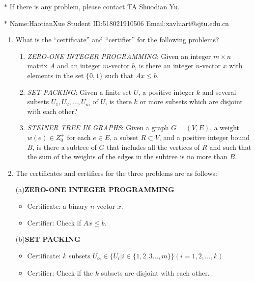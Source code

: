 \documentclass[12pt,a4paper]{article}
\makeatletter
\newtheorem*{solution}{Solution}
\theoremstyle{definition}
\renewenvironment{solution}[1][Solution] {\par\pushQED{\qed}\normalfont\topsep6\p@\@plus6\p@\relax\trivlist\item[\hskip\labelsep\bfseries#1\@addpunct{.}]\ignorespaces}{\popQED\endtrivlist\@endpefalse} \makeatother
\makeatother
\begin{document}
\noindent

\noindent{}
\begin{center}
\footnotesize{\color{red}$*$ If there is any problem, please contact TA Shuodian Yu. }

\footnotesize{\color{blue}$*$ Name:HaotianXue \quad Student ID:518021910506 \quad Email:xavhiart@sjtu.edu.cn}
\end{center}
\begin{enumerate}
	\item What is the ``certificate'' and ``certifier'' for the following problems?
	\begin{enumerate}
		\item \emph{ZERO-ONE INTEGER PROGRAMMING}: Given an integer $m \times n$ matrix $A$ and an integer $m$-vector $b$, is there an integer $n$-vector $x$ with elements in the set $\{0, 1\}$ such that $Ax \leq b$.
		\item \emph{SET PACKING}: Given a finite set $U$, a positive integer $k$ and several subsets $U_1, U_2, \ldots, U_m$ of $U$, is there $k$ or more subsets which are disjoint with each other?
		\item \emph{STEINER TREE IN GRAPHS}: Given a graph $G=(V,E)$, a weight $w(e)\in Z_0^{+}$ for each $e\in E$, a subset $R \subset V$, and a positive integer bound $B$, is there a subtree of $G$ that includes all the vertices of $R$ and such that the sum of the weights of the edges in the subtree is no more than $B$.
	\end{enumerate}
	   
	\begin{solution}
		The certificates and certifiers for the three problems are as follows:
		
		(a)\textbf{ZERO-ONE INTEGER PROGRAMMING}
		  \begin{itemize}
			  \item Certificate: a binary $n$-vector $x$.
			  \item Certifier: Check if $Ax\leq b$.
		  \end{itemize}

		(b)\textbf{SET PACKING}
		\begin{itemize}
			\item Certificate: $k$ subsets $U_{o_i} \in \{U_i|i \in \{1,2,3...,m\}\}(i=1, 2, ..., k)$ 
			\item Certifier: Check if the $k$ subsets are disjoint with each other.
		\end{itemize}


\end{solution}
\end{enumerate}
\end{document}
